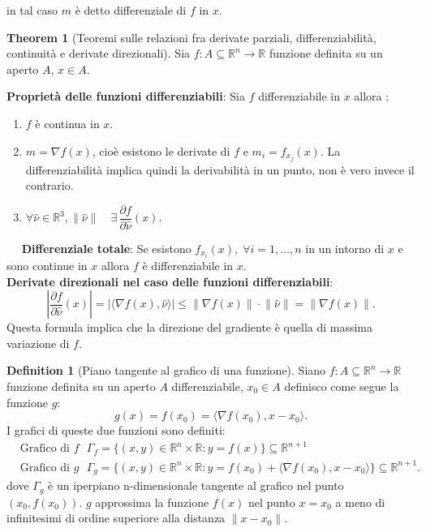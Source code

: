 \documentclass[leqno]{article}
\theoremstyle{definition}
\newtheorem{definition}{Definition}[section]
\numberwithin{equation}{section}
\newtheorem{theorem}{Theorem}[section]
\theoremstyle{remark}
\begin{document}
	in tal caso $m$ è detto differenziale di $f$ in $x$.
	
	\begin{theorem}[Teoremi sulle relazioni fra derivate parziali, differenziabilità, continuità e derivate direzionali]
		Sia $f:A\subseteq \mathbb{R}^n \rightarrow \mathbb{R}$ funzione definita su un aperto $A$, $ {x} \in A$.
		\newline
		
		\textbf{Proprietà delle funzioni differenziabili}:
		Sia $f$ differenziabile in $x$ allora :
		\begin{enumerate}
			\item $f$ è continua in $x$.
			\item $m=\nabla f (x)$, cioè esistono le derivate di $f$ e $m_i=f_{x_j}(x).$ La differenziabilità implica quindi la derivabilità in un punto, non è vero invece il contrario.
			\item $\forall \hat{\nu} \in \mathbb{R}^3, \lVert \hat{\nu} \rVert \quad \exists \, \dfrac{\partial f }{\partial \hat{\nu}}(x)$.
		\end{enumerate} 
		$\quad$ \textbf{Differenziale totale}: Se esistono $f_{x_i}(x), \; \forall i = 1, \dots ,n$ in un intorno di $x$ e sono continue in $x$ allora $f$ è differenziabile in $x$.
		\\
		\textbf{Derivate direzionali nel caso delle funzioni differenziabili}: 
		\begin{equation}
			\left| \dfrac{\partial f}{\partial \hat{\nu}}(x) \right|=\left| \langle \nabla f(x), \hat{\nu}\rangle \right| \le \lVert \nabla f(x)\rVert \cdot \lVert \hat{\nu} \rVert = \lVert \nabla f(x) \rVert.
		\end{equation}
		Questa formula implica che la direzione del gradiente è quella di massima variazione di $f$.
	\end{theorem}
	
	\begin{definition}[Piano tangente al grafico di una funzione]
		Siano $f:A\subseteq \mathbb{R}^n \rightarrow \mathbb{R}$ funzione definita su un aperto $A$ differenziabile, $ {x_0} \in A$ definisco come segue la funzione $g$:
		\begin{equation}
			g(x) = f(x_0)=\langle \nabla f (x_0) , x-x_0\rangle .
		\end{equation}
		I grafici di queste due funzioni sono definiti:
		\begin{equation}
			\begin{aligned}
				&\text{Grafico di $f$ } \Gamma_f =\{ (x,y)\in \mathbb{R}^n \times \mathbb{R} : y = f(x) \} \subseteq \mathbb{R}^{n+1} \\
				&\text {Grafico di $g$ } \Gamma_g = \{ (x,y)\in \mathbb{R}^n \times \mathbb{R} : y = f(x_0) + \langle \nabla f(x_0) , x - x_0 \rangle \} \subseteq \mathbb{R}^{n+1}.
			\end{aligned}
		\end{equation}
		dove $\Gamma_g$ è un iperpiano n-dimensionale tangente al grafico nel punto $(x_0,f(x_0))$. $g$ approssima la funzione $f(x)$ nel punto $x=x_0$ a meno di infinitesimi di ordine superiore alla distanza $\lVert x-x_0 \rVert$.
	\end{definition}
	
\end{document}
